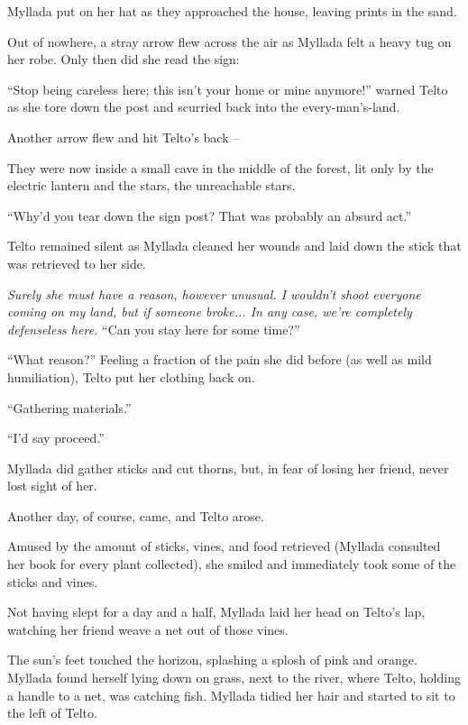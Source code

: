 Myllada put on her hat as they approached the house, leaving prints in the sand.

Out of nowhere, a stray arrow flew across the air as Myllada felt a heavy tug on her robe. Only then did she read the sign:


``Stop being careless here; this isn't your home or mine anymore!'' warned Telto as she tore down the post and scurried back into the every-man's-land.

Another arrow flew and hit Telto's back --

\centeredstars

They were now inside a small cave in the middle of the forest, lit only by the electric lantern and the stars, the unreachable stars.

``Why'd you tear down the sign post? That was probably an absurd act.''

Telto remained silent as Myllada cleaned her wounds and laid down the stick that was retrieved to her side.

\emph{Surely she must have a reason, however unusual. I wouldn't shoot everyone coming on my land, but if someone broke... In any case, we're completely defenseless here.} ``Can you stay here for some time?''

``What reason?'' Feeling a fraction of the pain she did before (as well as mild humiliation), Telto put her clothing back on.

``Gathering materials.''

``I'd say proceed.''

Myllada did gather sticks and cut thorns, but, in fear of losing her friend, never lost sight of her.

\centeredstars

Another day, of course, came, and Telto arose.

Amused by the amount of sticks, vines, and food retrieved (Myllada consulted her book for every plant collected), she smiled and immediately took some of the sticks and vines.

Not having slept for a day and a half, Myllada laid her head on Telto's lap, watching her friend weave a net out of those vines.

\centeredstars

The sun's feet touched the horizon, splashing a splosh of pink and orange. Myllada found herself lying down on grass, next to the river, where Telto, holding a handle to a net, was catching fish. Myllada tidied her hair and started to sit to the left of Telto.

